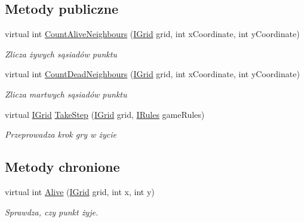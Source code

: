 \subsection*{Metody publiczne}
\begin{DoxyCompactItemize}
\item 
virtual int \hyperlink{class_convay_1_1_core_1_1_engine_af5d8b7993421d67c3fc6ba702521a7cd}{Count\+Alive\+Neighbours} (\hyperlink{interface_convay_1_1_core_1_1_interfaces_1_1_i_grid}{I\+Grid} grid, int x\+Coordinate, int y\+Coordinate)
\begin{DoxyCompactList}\small\item\em Zlicza żywych sąsiadów punktu \end{DoxyCompactList}\item 
virtual int \hyperlink{class_convay_1_1_core_1_1_engine_a51ab6b04c07f0803751d8013b422cc3d}{Count\+Dead\+Neighbours} (\hyperlink{interface_convay_1_1_core_1_1_interfaces_1_1_i_grid}{I\+Grid} grid, int x\+Coordinate, int y\+Coordinate)
\begin{DoxyCompactList}\small\item\em Zlicza martwych sąsiadów punktu \end{DoxyCompactList}\item 
virtual \hyperlink{interface_convay_1_1_core_1_1_interfaces_1_1_i_grid}{I\+Grid} \hyperlink{class_convay_1_1_core_1_1_engine_a02713f5cb5242a65d2e1816512e0b791}{Take\+Step} (\hyperlink{interface_convay_1_1_core_1_1_interfaces_1_1_i_grid}{I\+Grid} grid, \hyperlink{interface_convay_1_1_core_1_1_interfaces_1_1_i_rules}{I\+Rules} game\+Rules)
\begin{DoxyCompactList}\small\item\em Przeprowadza krok gry w życie \end{DoxyCompactList}\end{DoxyCompactItemize}
\subsection*{Metody chronione}
\begin{DoxyCompactItemize}
\item 
virtual int \hyperlink{class_convay_1_1_core_1_1_engine_a0d8721d8809a865703b4abb38987f487}{Alive} (\hyperlink{interface_convay_1_1_core_1_1_interfaces_1_1_i_grid}{I\+Grid} grid, int x, int y)
\begin{DoxyCompactList}\small\item\em Sprawdza, czy punkt żyje. \end{DoxyCompactList}\end{DoxyCompactItemize}
